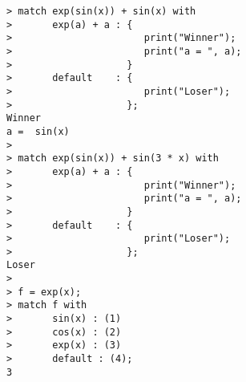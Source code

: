 \begin{center}\begin{minipage}{15cm}\begin{Verbatim}[frame=single]
> match exp(sin(x)) + sin(x) with
>       exp(a) + a : {
>                       print("Winner");
>                       print("a = ", a);
>                    }
>       default    : {
>                       print("Loser");
>                    };
Winner
a =  sin(x)
> 
> match exp(sin(x)) + sin(3 * x) with
>       exp(a) + a : {
>                       print("Winner");
>                       print("a = ", a);
>                    }
>       default    : {
>                       print("Loser");
>                    };
Loser
> 
> f = exp(x);
> match f with
>       sin(x) : (1)
>       cos(x) : (2)
>       exp(x) : (3)
>       default : (4);
3
\end{Verbatim}
\end{minipage}\end{center}

